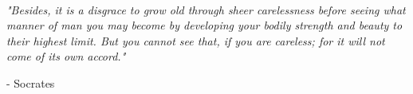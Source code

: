 \documentclass[footheight=20pt, footsepline, headheight=20pt, headsepline]{book}
\begin{document}
\newpage
~\vfill
\thispagestyle{empty}

\vspace*{\fill}
\textit{"Besides, it is a disgrace to grow old through sheer carelessness before seeing what manner of man you may become by developing your bodily strength and beauty to their highest limit. But you cannot see that, if you are careless; for it will not come of its own accord."}\\
\begin{center}
    - Socrates
\end{center}
\vspace*{\fill}
\newpage
\tableofcontents
\newpage


%




%



%
%
%
%
%
%
%
%

\printbibliography[heading=bibintoc,title={References}]
\end{document}
